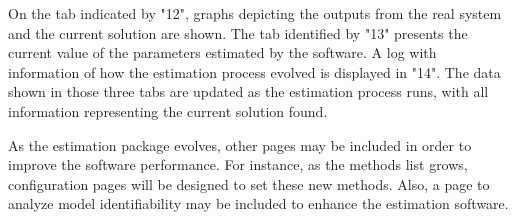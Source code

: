On the tab indicated by "12", graphs depicting the outputs from the real system and the current solution are shown. The tab identified by "13" presents the current value of the parameters estimated by the software. A log with information of how the estimation process evolved is displayed in "14". The data shown in those three tabs are updated as the estimation process runs, with all information representing the current solution found.

As the estimation package evolves, other pages may be included in order to improve the software performance. For instance, as the methods list grows, configuration pages will be designed to set these new methods. Also, a page to analyze model identifiability may be included to enhance the estimation software.